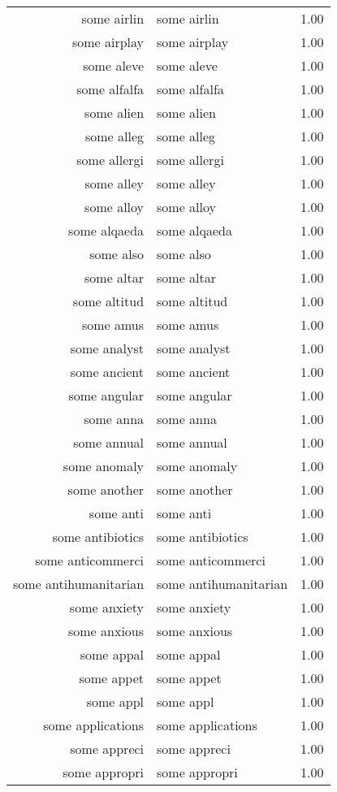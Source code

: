 \begin{table}[ht]
\begin{tabular}{rlr}
  some airlin & some airlin & 1.00 \\ 
  some airplay & some airplay & 1.00 \\ 
  some aleve & some aleve & 1.00 \\ 
  some alfalfa & some alfalfa & 1.00 \\ 
  some alien & some alien & 1.00 \\ 
  some alleg & some alleg & 1.00 \\ 
  some allergi & some allergi & 1.00 \\ 
  some alley & some alley & 1.00 \\ 
  some alloy & some alloy & 1.00 \\ 
  some alqaeda & some alqaeda & 1.00 \\ 
  some also & some also & 1.00 \\ 
  some altar & some altar & 1.00 \\ 
  some altitud & some altitud & 1.00 \\ 
  some amus & some amus & 1.00 \\ 
  some analyst & some analyst & 1.00 \\ 
  some ancient & some ancient & 1.00 \\ 
  some angular & some angular & 1.00 \\ 
  some anna & some anna & 1.00 \\ 
  some annual & some annual & 1.00 \\ 
  some anomaly & some anomaly & 1.00 \\ 
  some another & some another & 1.00 \\ 
  some anti & some anti & 1.00 \\ 
  some antibiotics & some antibiotics & 1.00 \\ 
  some anticommerci & some anticommerci & 1.00 \\ 
  some antihumanitarian & some antihumanitarian & 1.00 \\ 
  some anxiety & some anxiety & 1.00 \\ 
  some anxious & some anxious & 1.00 \\ 
  some appal & some appal & 1.00 \\ 
  some appet & some appet & 1.00 \\ 
  some appl & some appl & 1.00 \\ 
  some applications & some applications & 1.00 \\ 
  some appreci & some appreci & 1.00 \\ 
  some appropri & some appropri & 1.00 \\ 

\end{tabular}
\end{table}
